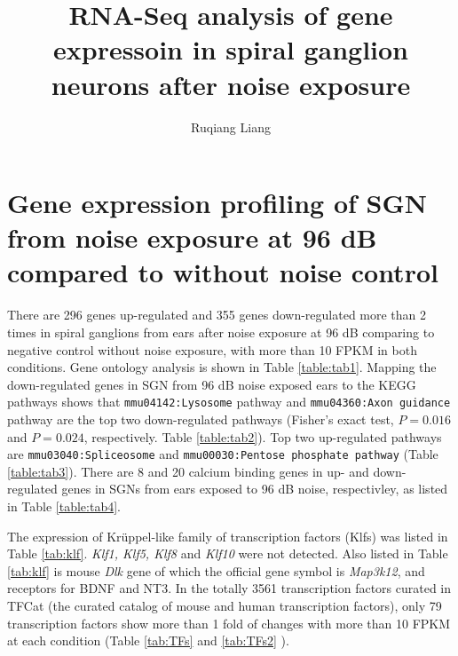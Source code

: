 \documentclass{article}
\begin{document}


\title{RNA-Seq analysis of gene expressoin in spiral ganglion neurons after noise exposure}
\author{Ruqiang Liang}
\maketitle

\section{Gene expression profiling of SGN from noise exposure at 96 dB compared to without noise control}
There are 296 genes up-regulated and 355 genes down-regulated more than 2 times in spiral ganglions from ears after noise exposure at 96 dB comparing to negative control without noise exposure, with more than 10 FPKM in both conditions. Gene ontology analysis is shown in Table \ref{table:tab1}. Mapping the down-regulated genes in SGN from 96 dB noise exposed ears to the KEGG pathways shows that \texttt{mmu04142:Lysosome} pathway and \texttt{mmu04360:Axon guidance} pathway are the top two down-regulated pathways (Fisher's exact test, $P=0.016$ and $P=0.024$, respectively. Table \ref{table:tab2}). Top two up-regulated pathways are \texttt{mmu03040:Spliceosome} and \texttt{mmu00030:Pentose phosphate pathway} (Table \ref{table:tab3}). There are 8 and 20 calcium binding genes in up- and down-regulated genes in SGNs from ears exposed to 96 dB noise, respectivley, as listed in Table \ref{table:tab4}.

The expression of Kr\"uppel-like family of transcription factors (Klfs) was listed in Table \ref{tab:klf}. {\it Klf1, Klf5, Klf8} and {\it Klf10} were not detected. Also listed in Table \ref{tab:klf} is mouse {\it Dlk} gene of which the official gene symbol is {\it Map3k12}, and receptors for BDNF and NT3. In the totally 3561 transcription factors curated in TFCat (the curated catalog of mouse and human transcription factors), only 79 transcription factors show more than 1 fold of changes with more than 10 FPKM at each condition (Table \ref{tab:TFs} and \ref{tab:TFs2} ).
\end{document}
